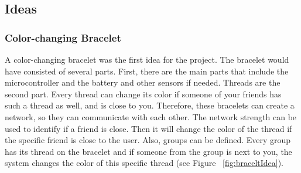 \documentclass[04_projectProcess.tex]{subfiles}
\begin{document}
    \subsection{Ideas}
    \label{Ideas}

    \subsubsection{Color-changing Bracelet}
    \begin{flushleft}
        A color-changing bracelet was the first idea for the project. The bracelet would have 
        consisted of several parts. First, there are the main parts that include the microcontroller 
        and the battery and other sensors if needed. Threads are the second part. 
        Every thread can change its color if someone of your friends has such a thread as well, and 
        is close to you. Therefore, these bracelets can create a network, so they can communicate 
        with each other. The network strength can be used to identify if a friend is close. Then it 
        will change the color of the thread if the specific friend is close to the user. Also, groups 
        can be defined. Every group has its thread on the bracelet and if someone from the group 
        is next to you, the system changes the color of this specific thread (see Figure ~\ref{fig:braceltIdea}).
    \end{flushleft}
\end{document}

